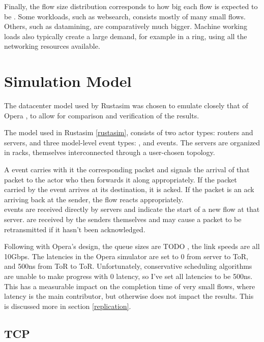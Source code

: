 Finally, the flow size distribution corresponds to how big each flow is expected to be \cite{alizadeh_data_2010} .
Some workloads, such as websearch, consists mostly of many small flows.
Others, such as datamining, are comparatively much bigger.
Machine working loads also typically create a large demand, for example in a ring, using all the networking resources available.

\section{Simulation Model} \label{model-sim}

The datacenter model used by Rustasim was chosen to emulate closely that of Opera , to allow for comparison and verification of the results.

The model used in Rustasim \ref{rustasim}, consists of two actor types: routers and servers, and three model-level event types: ,  and  events.
The servers are organized in racks, themselves interconnected through a user-chosen topology.

A  event carries with it the corresponding packet and signals the arrival of that packet to the actor who then forwards it along appropriately.
If the packet carried by the event arrives at its destination, it is acked. 
If the packet is an ack arriving back at the sender, the flow reacts appropriately.\\

 events are received directly by servers and indicate the start of a new flow at that server.
 are received by the senders themselves and may cause a packet to be retransmitted if it hasn't been acknowledged.

Following with Opera's design, the queue sizes are TODO , the link speeds are all 10Gbps.
The latencies in the Opera simulator are set to 0 from server to ToR, and 500ns from ToR to ToR.
Unfortunately, conservative scheduling algorithms are unable to make progress with 0 latency, so I've set all latencies to be 500ns.
This has a measurable impact on the completion time of very small flows, where latency is the main contributor, but otherwise does not impact the results.
This is discussed more in section \ref{replication}.


\subsection{TCP} \label{model-tcp}

